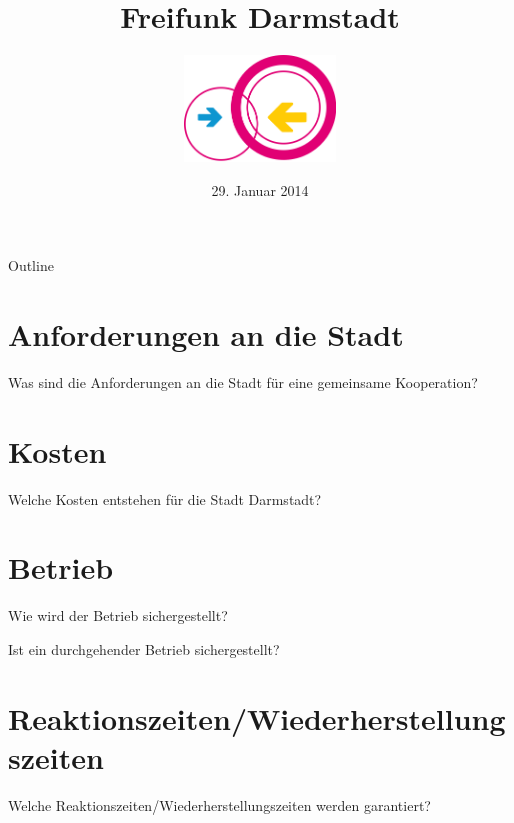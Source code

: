 \documentclass{beamer}
\title{Freifunk Darmstadt}
\author{\includegraphics[width=4cm]{images/logo}}
\date{29. Januar 2014}
\begin{document}
\begin{frame}
\maketitle
\end{frame}


\begin{frame}{Outline}
\tableofcontents
\end{frame}

\section{Anforderungen an die Stadt}
\begin{frame}{Was sind die Anforderungen an die Stadt für eine gemeinsame Kooperation?}
\end{frame}

\section{Kosten}
\begin{frame}{Welche Kosten entstehen für die Stadt Darmstadt?}
\end{frame}

\section{Betrieb}
\begin{frame}{Wie wird der Betrieb sichergestellt?}
\end{frame}

\begin{frame}{Ist ein durchgehender Betrieb sichergestellt?}
\end{frame}

\section{Reaktionszeiten/Wiederherstellungszeiten}
\begin{frame}{Welche Reaktionszeiten/Wiederherstellungszeiten werden garantiert?}
\end{frame}
\end{document}
